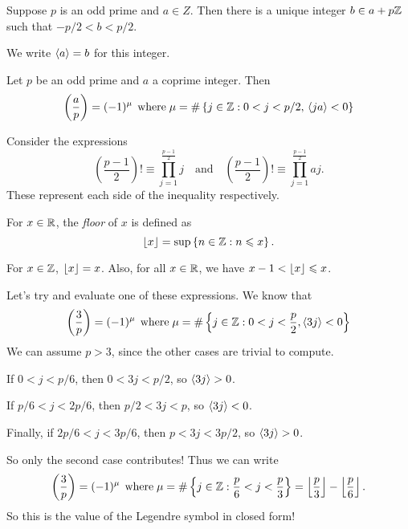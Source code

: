 \documentclass{article}
\begin{document}
\begin{definition}
	\label{closest-integer-to-zero}
    Suppose $p$ is an odd prime and $a \in Z$. Then there is a unique integer $b \in a + p\mathbb{Z}$ such that $-p/2 < b < p/2$.
    
    We write $\left\langle a \right\rangle = b$ for this integer.
\end{definition}

\begin{theorem}
	\label{gauss-lemma}
    Let $p$ be an odd prime and $a$ a coprime integer. Then
    \[
	\left( \frac{a}{p} \right) = (-1)^\mu
	\mathrel{\, \text{where}}
	\mu = \# \left\lbrace j \in \mathbb{Z} : 0 < j < p/2, \, \left\langle ja \right\rangle < 0 \right\rbrace
	\]
\end{theorem}

\begin{prf}
    Consider the expressions
    \[
	\left(  \frac{p-1}{2} \right) ! \equiv  \prod_{j=1}^\frac{p-1}{2} j
	\quad \text{and} \quad
	\left(  \frac{p-1}{2} \right) ! \equiv  \prod_{j=1}^\frac{p-1}{2} aj.
    \]
    These represent each side of the inequality respectively.
\end{prf}

\begin{definition}[Floor]
    For $x \in \mathbb{R}$, the \textit{floor} of $x$ is defined as
    \[
	\left\lfloor x\right\rfloor = \sup \left\lbrace n \in \mathbb{Z} : n \leqslant x \right\rbrace.
	\]
\end{definition}

\begin{note}
	For $x \in \mathbb{Z}$, $\left\lfloor x\right\rfloor = x$.
	Also, for all $x \in \mathbb{R}$, we have $x-1 < \left\lfloor x\right\rfloor \leqslant x$.
\end{note}

\begin{example}
	\label{legendre-symbol-example}
    Let's try and evaluate one of these expressions. We know that
    \[
	\left( \frac{3}{p} \right) = (-1)^\mu
	\mathrel{\, \text{where}}
	\mu = \# \left\lbrace j \in \mathbb{Z} : 0 < j < \frac{p}{2}, \left\langle 3j \right\rangle < 0 \right\rbrace
	\]
	We can assume $p > 3$, since the other cases are trivial to compute.
	
	If $0 < j < p/6$, then $0 < 3j < p/2$, so $\left\langle 3j \right\rangle > 0$.
	
	If $p/6 < j < 2p/6$, then $p/2 < 3j < p$, so $\left\langle 3j \right\rangle < 0$.
	
	Finally, if $2p/6 < j < 3p/6$, then $p < 3j < 3p/2$, so $\left\langle 3j \right\rangle > 0$.
	
	So only the second case contributes! Thus we can write
    \[
	\left( \frac{3}{p} \right) = (-1)^\mu
	\mathrel{\, \text{where}}
	\mu = \# \left\lbrace j \in \mathbb{Z} : \frac{p}{6} < j < \frac{p}{3} \right\rbrace
	 = \left\lfloor\frac{p}{3}\right\rfloor - \left\lfloor\frac{p}{6}\right\rfloor.
	\]
	So this is the value of the Legendre symbol in closed form!
\end{example}
\end{document}
